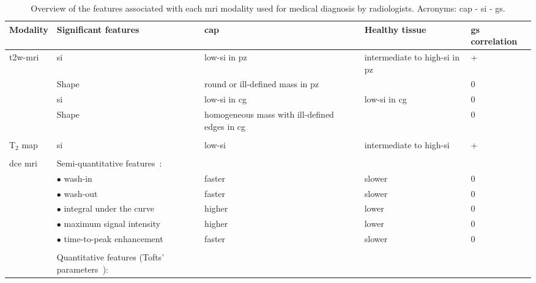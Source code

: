 \begin{landscape}
\begin{table}
  \scriptsize
    \caption[Overview of the features associated with each \acs*{mri} modality used for medical diagnosis by radiologists.]{Overview of the features associated with each \acs*{mri} modality used for medical diagnosis by radiologists. Acronyms: \acf{cap} - \acf{si} - \acf{gs}.}\label{tab:modmri}
    \begin{threeparttable}
      \centering
      \noindent
      \begin{tabularx}{\linewidth}{@{} l X X X l @{}}
        \toprule
        \textbf{Modality} & \textbf{Significant features} & \textbf{\acs*{cap}} & \textbf{Healthy tissue} & \textbf{\acs*{gs} correlation} \\
        \midrule
        \acs*{t2w}-\acs*{mri} & \acs*{si} & low-\acs*{si} in \acs*{pz}~\cite{Hricak1987} & intermediate to high-\acs*{si} in \acs*{pz}~\cite{Hricak1987} & +~\cite{Wang2008} \\ 
        & Shape & round or ill-defined mass in \acs*{pz}~\cite{Hricak1983} &  & 0 \\
        & \acs*{si} & low-\acs*{si} in \acs*{cg}~\cite{Akin2006,Barentsz2012} & low-\acs*{si} in \acs*{cg}~\cite{Akin2006,Barentsz2012} & 0 \\
        & Shape & homogeneous mass with ill-defined edges in \acs*{cg}~\cite{Akin2006, Barentsz2012} &  & 0 \\ \\
        T$_2$ map & \acs*{si} & low-\acs*{si}~\cite{Liney1996,Gibbs2001} & intermediate to high-\acs*{si}~\cite{Liney1996,Gibbs2001} & +~\cite{Liu2011,Liney1996,Liney1997}  \\ \\
        \acs*{dce} \acs*{mri} & Semi-quantitative features~\cite{Verma2012}: & & & \\
        & $\bullet$ wash-in & faster & slower & 0 \\
        & $\bullet$ wash-out & faster & slower & 0 \\
        & $\bullet$ integral under the curve & higher & lower & 0 \\
        & $\bullet$ maximum signal intensity & higher & lower & 0 \\
        & $\bullet$ time-to-peak enhancement & faster & slower & 0 \\ \\
        & Quantitative features (Tofts' parameters~\cite{Tofts2010}): & & & \\

\end{tabularx}
\end{threeparttable}
\end{table}
\end{landscape}
